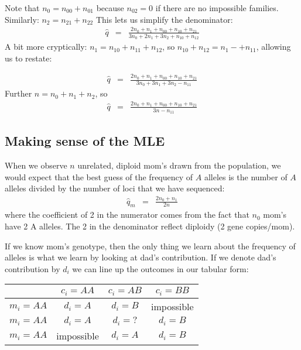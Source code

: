 \documentclass[11pt]{article}
\begin{document}
Note that $n_0 = n_{00} + n_{01}$ because $n_{02}=0$ if there are no impossible families.
Similarly: $n_2 = n_{21} + n_{22}$ 
This lets us simplify the denominator:
\begin{eqnarray}
\hat{q} & = & \frac{2n_0 + n_1 + n_{00} + n_{10} +n_{21}}{3n_0 + 2n_1 + 3n_2 + n_{10} + n_{12}}  \nonumber
\end{eqnarray}
A bit more cryptically: $n_{1} = n_{10} + n_{11} + n_{12}$, so $n_{10}  + n_{12} = n_1 -+ n_{11}$, allowing us to restate:

\begin{eqnarray}
\hat{q} & = & \frac{2n_0 + n_1 + n_{00} + n_{10} +n_{21}}{3n_0 + 3n_1 + 3n_2 - n_{11}}  \nonumber
\end{eqnarray}
Further $n= n_0 + n_1 + n_2$, so
\begin{eqnarray}
\hat{q} & = & \frac{2n_0 + n_1 + n_{00} + n_{10} +n_{21}}{3n - n_{11}}  \nonumber
\end{eqnarray}

\subsection*{Making sense of the MLE}
When we observe $n$ unrelated, diploid mom's drawn from the population, we would expect that the 
best guess of the frequency of $A$ alleles is the number of $A$ alleles divided by the number of loci that 
we have sequenced:
\begin{eqnarray}
  \hat{q}_m & = & \frac{2n_{0} + n_{1}}{2n}
\end{eqnarray}
where the coefficient of 2 in the numerator comes from the fact that $n_0$ mom's have 2 A alleles.
The 2 in the denominator reflect diploidy (2 gene copies/mom).

If we know mom's genotype, then the only thing we learn about the frequency of alleles is what we learn
by looking at dad's contribution.
If we denote dad's contribution by $d_i$ we can line up the outcomes in our tabular form:
\begin{table}[h!]
\begin{tabular}{r|c|c|c}
& $c_i=AA$ & $c_i=AB$ & $c_i=BB$ \\
\hline
$m_i=AA$ & $d_i=A$       & $d_i=B$ & impossible\\
$m_i=AA$ & $d_i=A$       & $d_i=?$ & $d_i=B$\\
$m_i=AA$ & impossible       & $d_i=A$ & $d_i=B$\\
\hline
\end{tabular}
\end{table}
\end{document}
